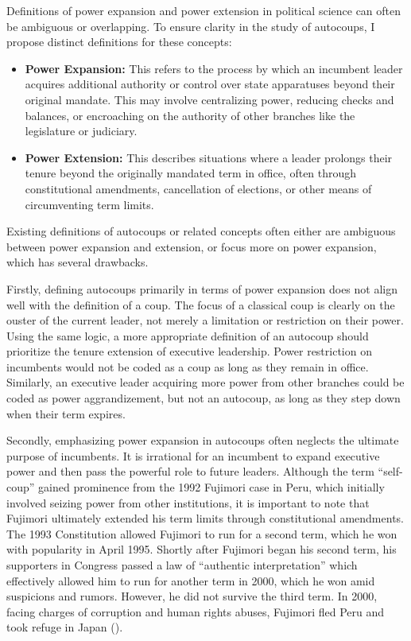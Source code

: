 \documentclass[
  12pt,
]{report}
\begin{document}
Definitions of power expansion and power extension in political science
can often be ambiguous or overlapping. To ensure clarity in the study of
autocoups, I propose distinct definitions for these concepts:

\begin{itemize}
\item
  \textbf{Power Expansion:} This refers to the process by which an
  incumbent leader acquires additional authority or control over state
  apparatuses beyond their original mandate. This may involve
  centralizing power, reducing checks and balances, or encroaching on
  the authority of other branches like the legislature or judiciary.
\item
  \textbf{Power Extension:} This describes situations where a leader
  prolongs their tenure beyond the originally mandated term in office,
  often through constitutional amendments, cancellation of elections, or
  other means of circumventing term limits.
\end{itemize}

Existing definitions of autocoups or related concepts often either are
ambiguous between power expansion and extension, or focus more on power
expansion, which has several drawbacks.

Firstly, defining autocoups primarily in terms of power expansion does
not align well with the definition of a coup. The focus of a classical
coup is clearly on the ouster of the current leader, not merely a
limitation or restriction on their power. Using the same logic, a more
appropriate definition of an autocoup should prioritize the tenure
extension of executive leadership. Power restriction on incumbents would
not be coded as a coup as long as they remain in office. Similarly, an
executive leader acquiring more power from other branches could be coded
as power aggrandizement, but not an autocoup, as long as they step down
when their term expires.

Secondly, emphasizing power expansion in autocoups often neglects the
ultimate purpose of incumbents. It is irrational for an incumbent to
expand executive power and then pass the powerful role to future
leaders. Although the term ``self-coup'' gained prominence from the 1992
Fujimori case in Peru, which initially involved seizing power from other
institutions, it is important to note that Fujimori ultimately extended
his term limits through constitutional amendments. The 1993 Constitution
allowed Fujimori to run for a second term, which he won with popularity
in April 1995. Shortly after Fujimori began his second term, his
supporters in Congress passed a law of ``authentic interpretation''
which effectively allowed him to run for another term in 2000, which he
won amid suspicions and rumors. However, he did not survive the third
term. In 2000, facing charges of corruption and human rights abuses,
Fujimori fled Peru and took refuge in Japan
().
\end{document}
